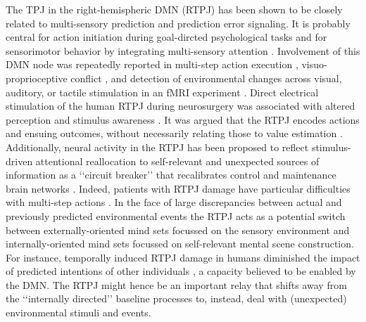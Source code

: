 \documentclass[10pt,letterpaper]{article}
\begin{document}
The TPJ in the right-hemispheric DMN (RTPJ)
has been shown to be closely related to
multi-sensory prediction and prediction error signaling.
It is probably central for
action initiation during goal-dircted psychological tasks and for
sensorimotor behavior by integrating multi-sensory attention
\citep{corbetta2002control}.
Involvement of this DMN node was repeatedly reported in
multi-step action execution \citep{hartmann2005takes},
visuo-proprioceptive conflict \citep{Balslev2005}, and
detection of environmental changes across
visual, auditory, or tactile stimulation in an fMRI experiment
\citep{downar2000multimodal}.
Direct electrical stimulation of the human
RTPJ during neurosurgery was associated with altered perception
and stimulus awareness \citep{blanke2002neuropsychology}.
%
It was argued that the RTPJ encodes actions and ensuing outcomes,
without necessarily relating those to value estimation
\citep{liljeholm2013neural, hamilton2008action,
jakobs2009effects}.
Additionally, neural activity in the RTPJ has been proposed to reflect
stimulus-driven attentional reallocation to
self-relevant and unexpected sources of information
as a ‘‘circuit breaker’’ that recalibrates control and maintenance brain networks
\citep{bzdok2013tpj, corbettashul2008}.
Indeed, patients with RTPJ damage have particular difficulties
with multi-step actions \citep{hartmann2005takes}.
In the face of large discrepancies between actual and previously predicted
environmental events the RTPJ acts as a potential switch between
externally-oriented mind sets focussed on the
sensory environment and internally-oriented mind sets focussed
on self-relevant mental scene construction.
For instance, temporally induced RTPJ damage in humans diminished the
impact of predicted intentions of other individuals
\citep{young2010disruption},
a capacity believed to be enabled by the DMN.
The RTPJ might hence be an important relay that shifts away
from the ‘‘internally directed’’ baseline processes
to, instead, deal with (unexpected) environmental stimuli and events.
\end{document}
